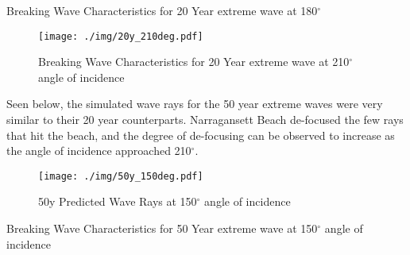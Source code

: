 \begin{table}[H]
\centering

\caption{Breaking Wave Characteristics for 20 Year extreme wave at 180$^{\circ}$}
\label{tab:20y_180deg}
\end{table}

\begin{figure}[H]
\centering
\texttt{[image: ./img/20y\_210deg.pdf]}
\caption{Breaking Wave Characteristics for 20 Year extreme wave at 210$^{\circ}$ angle of incidence}
\label{fig20y210deg}
\end{figure}


Seen below, the simulated wave rays for the 50 year extreme waves were very similar to their 20 year counterparts. Narragansett Beach de-focused the few rays that hit the beach, and the degree of de-focusing can be observed to increase as the angle of incidence approached 210$^{\circ}$.

\begin{figure}[H]
\centering
\texttt{[image: ./img/50y\_150deg.pdf]}
\caption{50y Predicted Wave Rays at 150$^{\circ}$ angle of incidence}
\label{fig:50y150deg}
\end{figure}

\begin{table}[H]
\centering

\caption{Breaking Wave Characteristics for 50 Year extreme wave at 150$^{\circ}$ angle of incidence}
\label{tab:50y_150deg}
\end{table}

